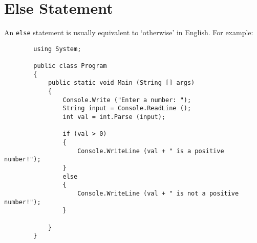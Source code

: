 \documentclass[../main.tex]{subfiles}
\begin{document}
    \section{Else Statement}
    An \texttt{else} statement is usually equivalent to `otherwise' in English.
    For example:
    \begin{verbatim}
        using System;

        public class Program
        {
            public static void Main (String [] args)
            {
                Console.Write ("Enter a number: ");
                String input = Console.ReadLine ();
                int val = int.Parse (input);

                if (val > 0)
                {
                    Console.WriteLine (val + " is a positive number!");
                }
                else
                {
                    Console.WriteLine (val + " is not a positive number!");
                }

            }
        }
    \end{verbatim}
\end{document}
